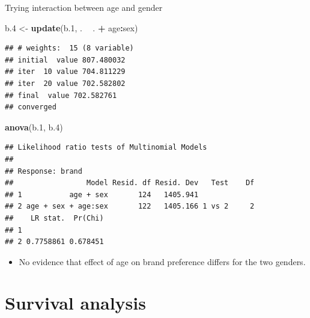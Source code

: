 \documentclass[ignorenonframetext,]{beamer}
\newenvironment{Shaded}{\begin{snugshade}}{\end{snugshade}}
\newcommand{\FloatTok}[1]{\textcolor[rgb]{0.00,0.00,0.81}{#1}}
\newcommand{\KeywordTok}[1]{\textcolor[rgb]{0.13,0.29,0.53}{\textbf{#1}}}
\newcommand{\NormalTok}[1]{#1}
\newcommand{\OperatorTok}[1]{\textcolor[rgb]{0.81,0.36,0.00}{\textbf{#1}}}
\newcommand{\StringTok}[1]{\textcolor[rgb]{0.31,0.60,0.02}{#1}}
\providecommand{\tightlist}{%
  \setlength{\itemsep}{0pt}\setlength{\parskip}{0pt}}
\begin{document}
\begin{frame}[fragile]{Trying interaction between age and gender}
\protect\hypertarget{trying-interaction-between-age-and-gender}{}

\scriptsize

\begin{Shaded}
\begin{Highlighting}[]
\NormalTok{b}\FloatTok{.4}\NormalTok{ <-}\StringTok{ }\KeywordTok{update}\NormalTok{(b}\FloatTok{.1}\NormalTok{, . }\OperatorTok{~}\StringTok{ }\NormalTok{. }\OperatorTok{+}\StringTok{ }\NormalTok{age}\OperatorTok{:}\NormalTok{sex)}
\end{Highlighting}
\end{Shaded}

\begin{verbatim}
## # weights:  15 (8 variable)
## initial  value 807.480032 
## iter  10 value 704.811229
## iter  20 value 702.582802
## final  value 702.582761 
## converged
\end{verbatim}

\begin{Shaded}
\begin{Highlighting}[]
\KeywordTok{anova}\NormalTok{(b}\FloatTok{.1}\NormalTok{, b}\FloatTok{.4}\NormalTok{)}
\end{Highlighting}
\end{Shaded}

\begin{verbatim}
## Likelihood ratio tests of Multinomial Models
## 
## Response: brand
##                 Model Resid. df Resid. Dev   Test    Df
## 1           age + sex       124   1405.941             
## 2 age + sex + age:sex       122   1405.166 1 vs 2     2
##    LR stat.  Pr(Chi)
## 1                   
## 2 0.7758861 0.678451
\end{verbatim}

\normalsize

\begin{itemize}
\tightlist
\item
  No evidence that effect of age on brand preference differs for the two
  genders.
\end{itemize}

\end{frame}

\hypertarget{survival-analysis}{%
\section{Survival analysis}\label{survival-analysis}}
\end{document}
